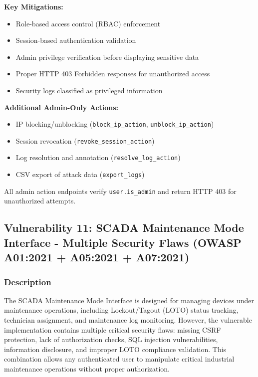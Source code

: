 \documentclass[12pt,a4paper]{article}
\begin{document}
\textbf{Key Mitigations:}
\begin{itemize}[leftmargin=*]
    \item Role-based access control (RBAC) enforcement
    \item Session-based authentication validation
    \item Admin privilege verification before displaying sensitive data
    \item Proper HTTP 403 Forbidden responses for unauthorized access
    \item Security logs classified as privileged information
\end{itemize}

\textbf{Additional Admin-Only Actions:}
\begin{itemize}[leftmargin=*]
    \item IP blocking/unblocking (\texttt{block\_ip\_action}, \texttt{unblock\_ip\_action})
    \item Session revocation (\texttt{revoke\_session\_action})
    \item Log resolution and annotation (\texttt{resolve\_log\_action})
    \item CSV export of attack data (\texttt{export\_logs})
\end{itemize}

All admin action endpoints verify \texttt{user.is\_admin} and return HTTP 403 for unauthorized attempts.

\newpage
\subsection{Vulnerability 11: SCADA Maintenance Mode Interface - Multiple Security Flaws (OWASP A01:2021 + A05:2021 + A07:2021)}

\subsubsection{Description}
The SCADA Maintenance Mode Interface is designed for managing devices under maintenance operations, including Lockout/Tagout (LOTO) status tracking, technician assignment, and maintenance log monitoring. However, the vulnerable implementation contains multiple critical security flaws: missing CSRF protection, lack of authorization checks, SQL injection vulnerabilities, information disclosure, and improper LOTO compliance validation. This combination allows any authenticated user to manipulate critical industrial maintenance operations without proper authorization.
\end{document}
